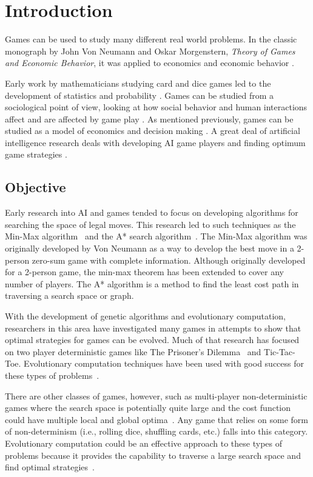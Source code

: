 \clearpage
\newpage
\chapter{Introduction}\label{chap:intro}
Games can be used to study many different real world problems. In the
classic monograph by John Von Neumann and Oskar Morgenstern, \emph{Theory of
Games and Economic Behavior}, it was applied to economics and economic behavior
\cite{neumann1944theory}.

Early work by mathematicians studying card and dice games led to the development
of statistics and probability \cite{hald1990history,rudas2008handbook}. Games
can be studied from a sociological point of view, looking at how social behavior
and human interactions affect and are affected by game play
\cite{fararo1992meaning}. As mentioned previously, games can be studied as a
model of economics and decision making \cite{neumann1944theory}. A great deal of
artificial intelligence research deals with developing AI game players and
finding optimum game strategies \cite{russell2010artificial}.

\section{Objective}

Early research into AI and games tended to focus on developing algorithms for
searching the space of legal moves. This research led to such techniques as the
Min-Max algorithm~\cite{neumann1944theory} and the A* search
algorithm~\cite{Hart_Nilsson_Raphael_1968,Hart:1972:LFB:1056777.1056779}. The
Min-Max algorithm was originally developed by Von Neumann as a way to develop
the best move in a 2-person zero-sum game with complete information. Although
originally developed for a 2-person game, the min-max theorem has been extended
to cover any number of players. The A* algorithm is a method to find the least
cost path in traversing a search space or graph.

With the development of genetic algorithms and evolutionary computation,
re\-search\-ers in this area have investigated many games in attempts to show
that optimal strategies for games can be evolved. Much of that research has
focused on two player deterministic games like The Prisoner's
Dilemma~\cite{Flood1958} and Tic-Tac-Toe. Evolutionary computation techniques
have been used with good success for these types of
problems~\cite{DBLP:conf/cig/QuekG07,Fogel1993}.

There are other classes of games, however, such as multi-player
non-deterministic games where the search space is potentially quite large and
the cost function could have multiple local and global
optima~\cite{condon1992complexity,condon1993algorithms,Walker:gamebe:2011}. Any
game that relies on some form of non-determinism (i.e., rolling dice, shuffling
cards, etc.) falls into this category. Evolutionary computation could be an
effective approach to these types of problems because it provides the capability
to traverse a large search space and find optimal
strategies~\cite{Quek_GAPoker,Foster1990219,eriksson2001evolution}.


